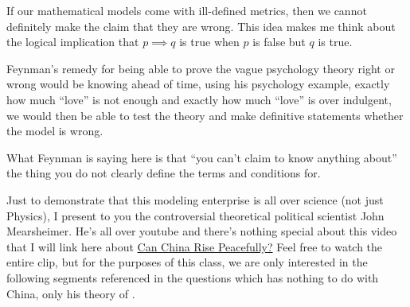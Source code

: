 \documentclass[12pt]{article}
\begin{document}
\begin{enumerate}
\begin{tcolorbox}[colback=white, sharp corners]

If our mathematical models come with ill-defined metrics, then we cannot definitely make the claim that they are wrong. This idea makes me think about the logical implication that $p \implies q$ is true when $p$ is false but $q$ is true.

\end{tcolorbox}

 

\begin{tcolorbox}[colback=white, sharp corners]

Feynman's remedy for being able to prove the vague psychology theory right or wrong would be knowing ahead of time, using his psychology example, exactly how much ``love'' is not enough  and exactly how much ``love'' is over indulgent, we would then be able to test the theory and make definitive statements whether the model is wrong. 

\end{tcolorbox}

 

\begin{tcolorbox}[colback=white, sharp corners]

What Feynman is saying here is that ``you can't claim to know anything about'' the thing you do not clearly define the terms and conditions for. 

\end{tcolorbox}


Just to demonstrate that this modeling enterprise is all over science (not just Physics), I present to you the controversial theoretical political scientist John Mearsheimer. He's all over youtube and there's nothing special about this video that I will link here about \href{https://www.youtube.com/watch?v=D_Mx_e8t7nU&t=4673s}{Can China Rise Peacefully?} Feel free to watch the entire clip, but for the purposes of this class, we are only interested in the following segments referenced in the questions which has nothing to do with China, only his theory of .


\end{enumerate}
\end{document}
